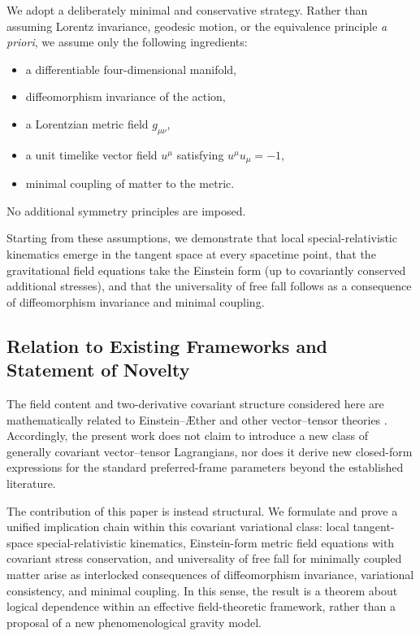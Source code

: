 \documentclass[11pt]{article}
\begin{document}
            We adopt a deliberately minimal and conservative strategy.
            Rather than assuming Lorentz invariance, geodesic motion, or the equivalence
            principle \emph{a priori}, we assume only the following ingredients:
            \begin{itemize}
                \item a differentiable four-dimensional manifold,
                \item diffeomorphism invariance of the action,
                \item a Lorentzian metric field $g_{\mu\nu}$,
                \item a unit timelike vector field $u^\mu$ satisfying $u^\mu u_\mu=-1$,
                \item minimal coupling of matter to the metric.
            \end{itemize}
            No additional symmetry principles are imposed.

            Starting from these assumptions, we demonstrate that local special-relativistic
            kinematics emerge in the tangent space at every spacetime point, that the
            gravitational field equations take the Einstein form (up to covariantly
            conserved additional stresses), and that the universality of free fall follows
            as a consequence of diffeomorphism invariance and minimal coupling.

        \subsection{Relation to Existing Frameworks and Statement of Novelty}

            The field content and two-derivative covariant structure considered here are
            mathematically related to Einstein--\AE ther and other vector--tensor theories
            \cite{jacobsonmattingly2001,jacobson2008}.
            Accordingly, the present work does not claim to introduce a new class of
            generally covariant vector--tensor Lagrangians, nor does it derive new closed-form
            expressions for the standard preferred-frame parameters beyond the established
            literature.

            The contribution of this paper is instead structural.
            We formulate and prove a unified implication chain within this covariant
            variational class:
            local tangent-space special-relativistic kinematics, Einstein-form metric field
            equations with covariant stress conservation, and universality of free fall for
            minimally coupled matter arise as interlocked consequences of diffeomorphism
            invariance, variational consistency, and minimal coupling.
            In this sense, the result is a theorem about logical dependence within an
            effective field-theoretic framework, rather than a proposal of a new
            phenomenological gravity model.
\end{document}
